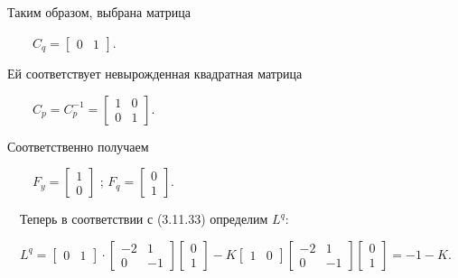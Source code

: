 \documentclass[a4paper]{article}
\begin{document}
{\begin{russian}\sffamily
Таким образом, выбрана матрица 
\end{russian}}

{\begin{russian}\sffamily
\ \ \ \  $C_q=\left[\begin{matrix}0&1\end{matrix}\right]$.
\end{russian}}


\bigskip


\bigskip


\bigskip


\bigskip

{\begin{russian}\sffamily
Ей соответствует невырожденная квадратная матрица
\end{russian}}

{\begin{russian}\sffamily
\ \ \ \  $C_p=C_p^{-1}=\left[\begin{matrix}1&0\\0&1\end{matrix}\right]$. 
\end{russian}}

{\begin{russian}\sffamily
Соответственно получаем
\end{russian}}

{\begin{russian}\sffamily
\ \ \ \  $F_y=\left[\begin{matrix}1\\0\end{matrix}\right]\text{  ;  }F_q=\left[\begin{matrix}0\\1\end{matrix}\right]$.
\end{russian}}

{\begin{russian}\sffamily
\ \ Теперь в соответствии с (3.11.33) определим  $L^q$:
\end{russian}}

{\begin{russian}\sffamily
\ \  $L^q=\left[\begin{matrix}0&1\end{matrix}\right]\cdot
\left[\begin{matrix}-2&1\\0&-1\end{matrix}\right]\left[\begin{matrix}0\\1\end{matrix}\right]-K\left[\begin{matrix}1&0\end{matrix}\right]\left[\begin{matrix}-2&1\\0&-1\end{matrix}\right]\left[\begin{matrix}0\\1\end{matrix}\right]=-1-K$.
\end{russian}}
\end{document}
